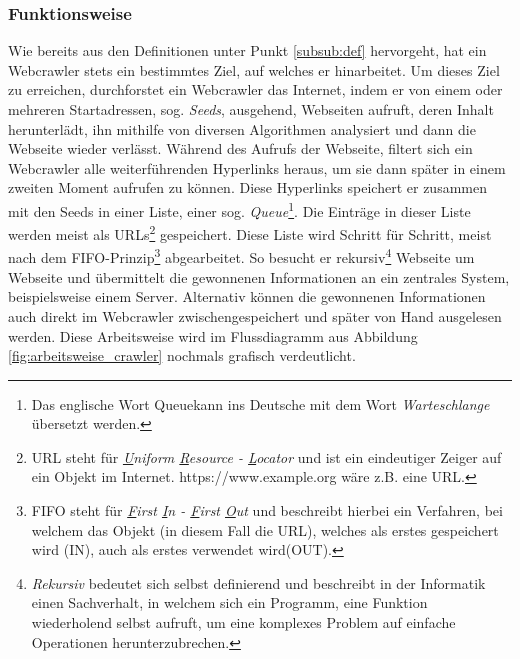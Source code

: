 \subsubsection{Funktionsweise}
Wie bereits aus den Definitionen unter Punkt \ref{subsub:def} hervorgeht, hat ein Webcrawler stets ein bestimmtes Ziel, auf welches er hinarbeitet. Um dieses Ziel zu erreichen, durchforstet ein Webcrawler das Internet, indem er von einem oder mehreren Startadressen, sog. \emph{Seeds}, ausgehend, Webseiten aufruft, deren Inhalt herunterlädt, ihn mithilfe von diversen Algorithmen analysiert und dann die Webseite wieder verlässt. Während des Aufrufs der Webseite, filtert sich ein Webcrawler alle weiterführenden Hyperlinks heraus, um sie dann später in einem zweiten Moment aufrufen zu können. Diese Hyperlinks speichert er zusammen mit den Seeds in einer Liste, einer sog. \emph{Queue}\footnote{Das englische Wort \glqq Queue\grqq\space kann ins Deutsche mit dem Wort \emph{Warteschlange} übersetzt werden.}. Die Einträge in dieser Liste werden meist als URLs\footnote{URL steht für \emph{\underline{U}niform \underline{R}esource - \underline{L}ocator} und ist ein eindeutiger Zeiger auf ein Objekt im Internet. https://www.example.org wäre z.B. eine URL.} gespeichert. Diese Liste wird Schritt für Schritt, meist nach dem FIFO-Prinzip\footnote{FIFO steht für \emph{\underline{F}irst \underline{I}n - \underline{F}irst \underline{O}ut} und beschreibt hierbei ein Verfahren, bei welchem das Objekt (in diesem Fall die URL), welches als erstes gespeichert wird (IN), auch als erstes verwendet wird(OUT).} abgearbeitet. So besucht er rekursiv\footnote{\emph{Rekursiv} bedeutet sich selbst definierend und beschreibt in der Informatik einen Sachverhalt, in welchem sich ein Programm, eine Funktion wiederholend selbst aufruft, um eine komplexes Problem auf einfache Operationen herunterzubrechen.} Webseite um Webseite und übermittelt die gewonnenen Informationen an ein zentrales System, beispielsweise einem Server. Alternativ können die gewonnenen Informationen auch direkt im Webcrawler zwischengespeichert und später von Hand ausgelesen werden. Diese Arbeitsweise wird im Flussdiagramm aus Abbildung \ref{fig:arbeitsweise_crawler} nochmals grafisch verdeutlicht.
